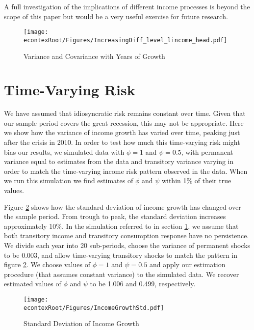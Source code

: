 \documentclass[titlepage]{\econtex}\newcommand{\texname}{ConsumptionHeterogeneity}
\begin{document}
	A full investigation of the implications of different income processes is beyond the scope of this paper but would be a very useful exercise for future research.
	
	\begin{figure} 
		\begin{centering}
			\texttt{[image: \\econtexRoot/Figures/IncreasingDiff\_level\_lincome\_head.pdf]}
			\caption{Variance and Covariance with Years of Growth}
			\label{fig:increasing_diff}
		\end{centering}
	\end{figure}
	
	\section{Time-Varying Risk} \label{time_varying_risk}
	\setcounter{figure}{0}   
	\setcounter{table}{0} 
	We have assumed that idiosyncratic risk remains constant over time. Given that our sample period covers the great recession, this may not be appropriate. Here we show how the variance of income growth has varied over time, peaking just after the crisis in 2010. In order to test how much this time-varying risk might bias our results, we simulated data with $\phi=1$ and $\psi=0.5$, with permanent variance equal to estimates from the data and transitory variance varying in order to match the time-varying income risk pattern observed in the data. When we run this simulation we find estimates of $\phi$ and $\psi$ within 1\% of their true values.
	
	Figure \ref{fig:income_growth_std} shows how the standard deviation of income growth has changed over the sample period. From trough to peak, the standard deviation increases approximately 10\%. In the simulation referred to in section \ref{time_varying_risk}, we assume that both transitory income and transitory consumption response have no persistence. We divide each year into 20 sub-periods, choose the variance of permanent shocks to be 0.003, and allow time-varying transitory shocks to match the pattern in figure \ref{fig:income_growth_std}. We choose values of $\phi=1$ and $\psi=0.5$ and apply our estimation procedure (that assumes constant variance) to the simulated data. We recover estimated values of $\phi$ and $\psi$ to be 1.006 and 0.499, respectively.
	\begin{figure} 
		\begin{centering}
			\texttt{[image: \\econtexRoot/Figures/IncomeGrowthStd.pdf]}
			\caption{Standard Deviation of Income Growth}
			\label{fig:income_growth_std}
		\end{centering}
	\end{figure}
	
\end{document}

